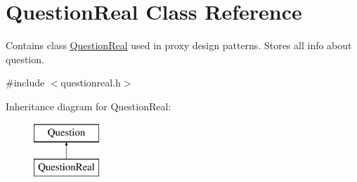 \hypertarget{class_question_real}{}\section{Question\+Real Class Reference}
\label{class_question_real}


Contains class \hyperlink{class_question_real}{Question\+Real} used in proxy design patterns. Stores all info about question.  




{\ttfamily \#include $<$questionreal.\+h$>$}

Inheritance diagram for Question\+Real\+:\begin{figure}[H]
\begin{center}
\leavevmode
\includegraphics[height=2.000000cm]{class_question_real}
\end{center}
\end{figure}
